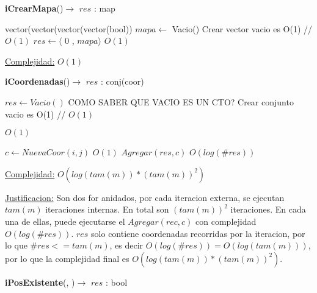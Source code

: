 \begin{Algoritmos}


\begin{algorithm}[H]
{\textbf{iCrearMapa}()$\to$ $res$ : map}
\begin{algorithmic}[1]
   
\State vector(vector(vector(vector(bool)) $mapa \gets$ Vacio()    \Comment Crear vector vacio es O(1) // $O(1)$
\State $res \gets  \langle$ 0 , $mapa \rangle $   \Comment $O(1)$

\medskip
\Statex \underline{Complejidad:} $O(1)$

\end{algorithmic}
\end{algorithm}

\begin{algorithm}[H]
{\textbf{iCoordenadas}()$\to$ $res$ : conj(coor)}
\begin{algorithmic}[1]
   
 
\State $res \gets Vacio() $     COMO SABER QUE VACIO ES UN CTO?  \Comment Crear conjunto vacio es O(1) // $O(1)$

	
		
		  \Comment $O(1)$
			
			\State $c \gets NuevaCoor(i, j) $  \Comment $O(1)$			
			\State $Agregar(res, c) $  \Comment $O(log(\#res))$			
			
		\EndIf
		
	\EndFor

\EndFor


\medskip
\Statex \underline{Complejidad:} $O(log(tam(m))*(tam(m))^2)$

\Statex \underline{Justificacion:} Son dos for anidados, por cada iteracion externa, se ejecutan $tam(m)$ iteraciones internas. En total son $(tam(m))^2$ iteraciones. En cada una de ellas, puede ejecutarse el $Agregar(rec, c)$ con complejidad $O(log(\#res))$. $res$ solo contiene coordenadas recorridas por la iteracion, por lo que $\#res <= tam(m)$, es decir $O(log(\#res)) = O(log(tam(m)))$, por lo que la complejidad final es $O(log(tam(m))*(tam(m))^2)$.

\end{algorithmic}
\end{algorithm}


\begin{algorithm}[H]
{\textbf{iPosExistente}(, )$\to$ $res$ : bool}
\begin{algorithmic}[1]
   


\end{algorithmic}
\end{algorithm}
\end{Algoritmos}
